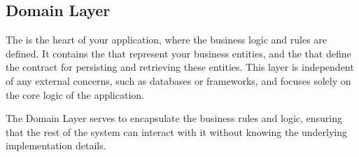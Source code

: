 \documentclass[letterpaper,10pt,english]{sphinxhowto}
\begin{document}
\sphinxstepscope


\subsection{Domain Layer}
\label{\detokenize{architecture/domain/index:domain-layer}}\label{\detokenize{architecture/domain/index::doc}}
\sphinxAtStartPar
The  is the heart of your application, where the business logic and rules are defined. It contains the  that represent your business entities, and the  that define the contract for persisting and retrieving these entities. This layer is independent of any external concerns, such as databases or frameworks, and focuses solely on the core logic of the application.

\sphinxAtStartPar
The Domain Layer serves to encapsulate the business rules and logic, ensuring that the rest of the system can interact with it without knowing the underlying implementation details.
\end{document}
